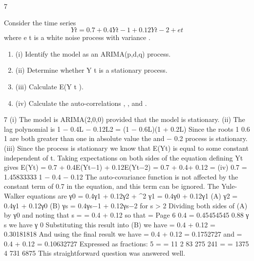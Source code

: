 \documentclass[a4paper,12pt]{article}
\begin{document}
7

Consider the time series
\[Y t = 0.7 + 0.4Y t− 1 + 0.12Y t− 2 + e t\]
where e t is a white noise process with variance  .
\begin{enumerate}
\item (i) Identify the model as an ARIMA(p,d,q) process. 
\item (ii) Determine whether Y t is a stationary process. 
\item (iii) Calculate E(Y t ). 
\item (iv) Calculate the auto-correlations  ,  ,  and  .
\end{enumerate}

7
(i) The model is ARIMA(2,0,0) provided that the model is stationary.
(ii) The lag polynomial is 1 − 0.4L − 0.12L2 = (1 − 0.6L)(1 + 0.2L)
Since the roots
1
0.6
1 are both greater than one in absolute value the
and − 0.2
process is stationary.
(iii)
Since the process is stationary we know that E(Yt) is equal to some constant \mu 
independent of t.
Taking expectations on both sides of the equation defining Yt gives
E(Yt) = 0.7 + 0.4E(Yt−1) + 0.12E(Yt−2)
\mu  = 0.7 + 0.4\mu  + 0.12\mu 
\mu  =
(iv)
0.7
= 1.45833333
1 − 0.4 − 0.12
The auto-covariance function is not affected by the constant term of 0.7 in the
equation, and this term can be ignored.
The Yule-Walker equations are
γ0 = 0.4γ1 + 0.12γ2 + \sigma^{2}
γ1 = 0.4γ0 + 0.12γ1 (A)
γ2 = 0.4γ1 + 0.12γ0 (B)
γs = 0.4γs−1 + 0.12γs−2 for s > 2
Dividing both sides of (A) by γ0 and noting that \rho  s =
 = 0.4 + 0.12 so that  =
Page 6
0.4
= 0.45454545
0.88
γ s
we have
γ 0%
Substituting this result into (B) we have
 = 0.4  + 0.12 = 0.30181818
And using the final result we have
 = 0.4  + 0.12  = 0.1752727
and
 = 0.4  + 0.12  = 0.10632727
Expressed as fractions:
5 \rho  =
 = 11
2
83
275
241 \rho  =
 = 1375
4
731
6875
This straightforward question was answered well.
\end{document}
